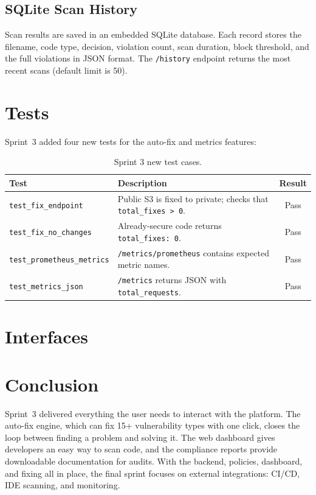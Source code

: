 
\subsection{SQLite Scan History}

Scan results are saved in an embedded SQLite database. Each record stores the filename, code type, decision, violation count, scan duration, block threshold, and the full violations in JSON format. The \texttt{/history} endpoint returns the most recent scans (default limit is 50).


\section{Tests}

Sprint~3 added four new tests for the auto-fix and metrics features:

\begin{table}[H]
\centering
\begin{tabularx}{\textwidth}{|l|X|c|}
\hline
\textbf{Test} & \textbf{Description} & \textbf{Result} \\
\hline
\texttt{test\_fix\_endpoint}          & Public S3 is fixed to private; checks that \texttt{total\_fixes > 0}. & Pass \\
\hline
\texttt{test\_fix\_no\_changes}       & Already-secure code returns \texttt{total\_fixes: 0}. & Pass \\
\hline
\texttt{test\_prometheus\_metrics}    & \texttt{/metrics/prometheus} contains expected metric names. & Pass \\
\hline
\texttt{test\_metrics\_json}          & \texttt{/metrics} returns JSON with \texttt{total\_requests}. & Pass \\
\hline
\end{tabularx}
\caption{Sprint 3 new test cases.}
\label{tab:s3-tests}
\end{table}


\section{Interfaces}



\section{Conclusion}

Sprint~3 delivered everything the user needs to interact with the platform. The auto-fix engine, which can fix 15+ vulnerability types with one click, closes the loop between finding a problem and solving it. The web dashboard gives developers an easy way to scan code, and the compliance reports provide downloadable documentation for audits. With the backend, policies, dashboard, and fixing all in place, the final sprint focuses on external integrations: CI/CD, IDE scanning, and monitoring.
